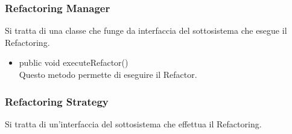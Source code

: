 \documentclass[11pt]{article}
\begin{document}
		
			\subsubsection{Refactoring Manager}
			Si tratta di una classe che funge da interfaccia del sottosistema che esegue il Refactoring.
		\begin{itemize}
			
			\item public void executeRefactor()\\
			Questo metodo permette di eseguire il Refactor.
		\end{itemize}	
	
		\subsubsection{Refactoring Strategy}
		Si tratta di un'interfaccia del sottosistema che effettua il Refactoring.
\end{document}
